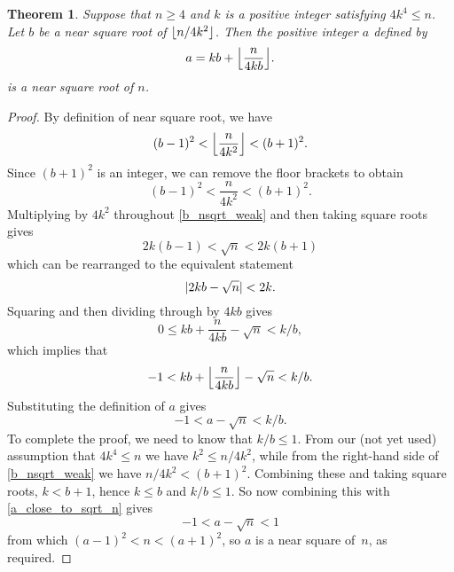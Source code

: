 \documentclass[a4paper]{article}
\DeclarePairedDelimiter\floor{\lfloor}{\rfloor}
\DeclarePairedDelimiter\abs{\lvert}{\rvert}
\theoremstyle{plain}
\newtheorem{theorem}{Theorem}
\theoremstyle{definition}
\begin{document}
\begin{theorem}\label{main_theorem}
  Suppose that $n \ge 4$ and $k$ is a positive integer satisfying $4k^4 \le
  n$. Let $b$ be a near square root of $\floor{n / 4k^2}$. Then the positive
  integer $a$ defined by
  $$ a = kb + \floor*{\frac{n}{4kb}}. $$
  is a near square root of $n$.
\end{theorem}

\begin{proof}
  By definition of near square root, we have
  \begin{equation}\label{b_nsqrt}
    (b - 1)^2 < \floor*{\frac{n}{4k^2}} < (b + 1)^2.
  \end{equation}
  Since $(b + 1)^2$ is an integer, we can remove the floor brackets to obtain
  \begin{equation}\label{b_nsqrt_weak}
    (b - 1)^2 < \frac{n}{4k^2} < (b + 1)^2.
  \end{equation}
  Multiplying by $4k^2$ throughout \eqref{b_nsqrt_weak} and then taking square
  roots gives
  \begin{equation}
    2k(b - 1) < \sqrt n < 2k(b + 1)
  \end{equation}
  which can be rearranged to the equivalent statement
  \begin{equation}
    \abs{2kb - \sqrt n} < 2k.
  \end{equation}
  Squaring and then dividing through by $4kb$ gives
  \begin{equation}
    0 \le kb + \frac{n}{4kb} - \sqrt n < k/b,
  \end{equation}
  which implies that
  \begin{equation}
    -1 < kb + \floor*{\frac{n}{4kb}} - \sqrt n < k/b.
  \end{equation}
  Substituting the definition of $a$ gives
  \begin{equation}\label{a_close_to_sqrt_n}
    -1 < a - \sqrt n < k/b.
  \end{equation}
  To complete the proof, we need to know that $k / b \le 1$. From our (not yet
  used) assumption that $4k^4 \le n$ we have $k^2 \le n / 4k^2$, while from the
  right-hand side of \eqref{b_nsqrt_weak} we have $n / 4k^2 < (b + 1)^2$.
  Combining these and taking square roots, $k < b + 1$, hence $k \le b $ and $k
  / b \le 1$. So now combining this with \eqref{a_close_to_sqrt_n} gives
  \begin{equation}
    -1 < a - \sqrt n < 1
  \end{equation}
  from which $(a - 1)^2 < n < (a + 1)^2$, so $a$ is a near square of~$n$, as
  required.
\end{proof}
\end{document}
